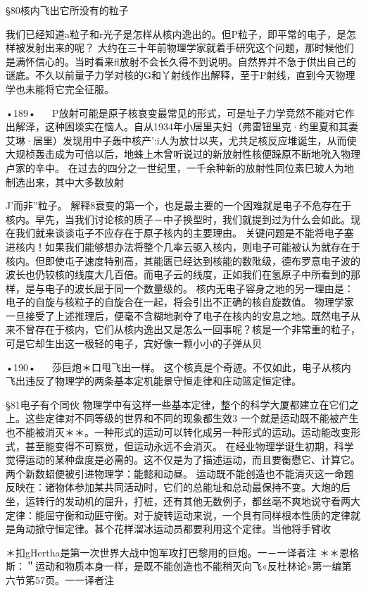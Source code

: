 §80核内飞出它所没有的粒子

我们已经知道a粒子和r光子是怎样从核内逸出的。但P粒子，即平常的电子，是怎样被发射出来的呢？
大约在三十年前物理学家就着手研究这个问题，那时候他们是满怀信心的。当时看来fl放射不会长久得不到说明。自然界并不急于供出自己的谜底。不久以前量子力学对核的G和丫射线作出解释，至于P射线，直到今天物理学也未能将它完全征服。

•189•
  
P放射可能是原子核哀变最常见的形式，可是址子力学竞然不能对它作出解泽，这种困埮实在恼人。自从1934年小居里夫妇（弗雷钮里克·约里夏和其妻艾琳·居里）发现用中子轰中核产':i人为放廿以夹，尤共足核反应堆诞生，从而使大规桢轰击成为可倍以后，地蛛上木曾听说过的新放射性核便跺原不断地吮入物理卢家的辛中。
在过去的四分之一世纪里，一千余种新的放射性同位素巳玻人为地制选出来，其中大多数放射{J'而非”粒子。
解释8衰变的第一个，也是最主要的一个困难就是电子不危存在于核内。早先，当我们讨论核的质子－中子换型时，我们就提到过为什么会如此。现在我们就来谈谈屯子不应存在于原子核内的主要理由。
关键问题是不能将电子塞进核内！如果我们能够想办法将整个几率云驱入核内，则电子可能被认为就存在于核内。但即使屯子速度特别高，其能匮已经达到核能的数阰级，德布罗意电子波的波长也仍较核的线度大几百倍。而电子云的线度，正如我们在氢原子中所看到的那样，是与电子的波长屈于同一个数量级的。
核内无电子容身之地的另一理由是：电子的自旋与核粒子的自旋合在一起，将会引出不正确的核自旋数值。
物理学家一旦接受了上述推理后，便毫不含糊地剥夺了电子在核内的安息之地。既然电子从来不曾存在于核内，它们从核内逸出又是怎么一回事呢？核是一个非常重的粒子，可是它却生出这一极轻的电子，宾好像一颗小小的子弹从贝

•190•
  
莎巨炮＊口甩飞出一样。
这个核真是个奇迹。不仅如此，电子从核内飞出违反了物理学的两条基本定机能景守恒走律和庄动篮定恒定律。

§81电子有个同伙
物理学中有这样一些基本定律，整个的科学大厦都建立在它们之上。这些定律对不同等级的世界和不同的现象都生效3
一个就是运动既不能被产生也不能被消灭＊＊。一种形式的运动可以转化成另一种形式的运动。运动能改变形式，甚至能变得不可察觉，但运动永远不会消灭。
在经业物理学诞生初期，科学觉得运动的某种盘度是必需的。这不仅是为了描述运动，而且要衡懋它、计算它。两个新数蛁便被引进物理学：能懿和动昼。
运动既不能创造也不能消灭这一命题反映在：诸物体参加某共同活动时，它们的总能址和总动最保持不变。大炮的后坐，运转行的发动机的屈升，打桩，还有其他无数例子，都丝亳不爽地说守看两大定律：能屈守衡和动匪守衡。对于旋转运动来说，一个具有同样根本性质的定律就是角动掀守恒定律。甚个花样溜冰运动员都要利用这个定律。当他将手臂收

＊扣gHertha是第一次世界大战中饱军攻打巴黎用的巨炮。一－一译者注
＊＊恩格斯：＂运动和物质本身一样，是既不能创造也不能稍灭向飞«反杜林论»第一编第六节笫57页。一一译者注

}
